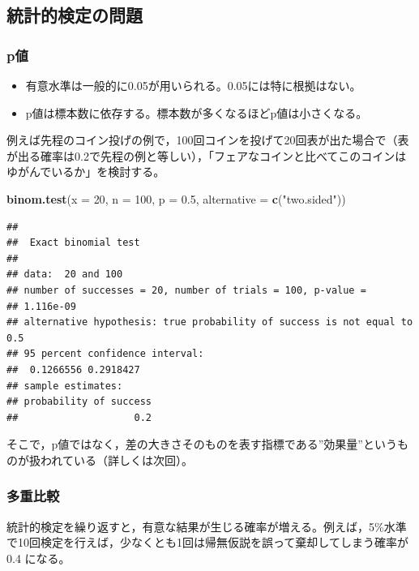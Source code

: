 \documentclass[]{article}
\newenvironment{Shaded}{\begin{snugshade}}{\end{snugshade}}
\newcommand{\KeywordTok}[1]{\textcolor[rgb]{0.13,0.29,0.53}{\textbf{#1}}}
\newcommand{\DataTypeTok}[1]{\textcolor[rgb]{0.13,0.29,0.53}{#1}}
\newcommand{\DecValTok}[1]{\textcolor[rgb]{0.00,0.00,0.81}{#1}}
\newcommand{\FloatTok}[1]{\textcolor[rgb]{0.00,0.00,0.81}{#1}}
\newcommand{\StringTok}[1]{\textcolor[rgb]{0.31,0.60,0.02}{#1}}
\newcommand{\NormalTok}[1]{#1}
\begin{document}
\subsection{統計的検定の問題}

\subsubsection{p値}\label{p}

\begin{itemize}
\item
  有意水準は一般的に0.05が用いられる。0.05には特に根拠はない。
\item
  p値は標本数に依存する。標本数が多くなるほどp値は小さくなる。
\end{itemize}

例えば先程のコイン投げの例で，100回コインを投げて20回表が出た場合で（表が出る確率は0.2で先程の例と等しい），「フェアなコインと比べてこのコインはゆがんでいるか」を検討する。

\begin{Shaded}
\begin{Highlighting}[]
\KeywordTok{binom.test}\NormalTok{(}\DataTypeTok{x =} \DecValTok{20}\NormalTok{, }\DataTypeTok{n =} \DecValTok{100}\NormalTok{, }\DataTypeTok{p =} \FloatTok{0.5}\NormalTok{, }\DataTypeTok{alternative =} \KeywordTok{c}\NormalTok{(}\StringTok{"two.sided"}\NormalTok{))}
\end{Highlighting}
\end{Shaded}

\begin{verbatim}
## 
##  Exact binomial test
## 
## data:  20 and 100
## number of successes = 20, number of trials = 100, p-value =
## 1.116e-09
## alternative hypothesis: true probability of success is not equal to 0.5
## 95 percent confidence interval:
##  0.1266556 0.2918427
## sample estimates:
## probability of success 
##                    0.2
\end{verbatim}

そこで，p値ではなく，差の大きさそのものを表す指標である''効果量''というものが扱われている（詳しくは次回）。

\subsubsection{多重比較}

統計的検定を繰り返すと，有意な結果が生じる確率が増える。例えば，5\%水準で10回検定を行えば，少なくとも1回は帰無仮説を誤って棄却してしまう確率が0.4
になる。
\end{document}
